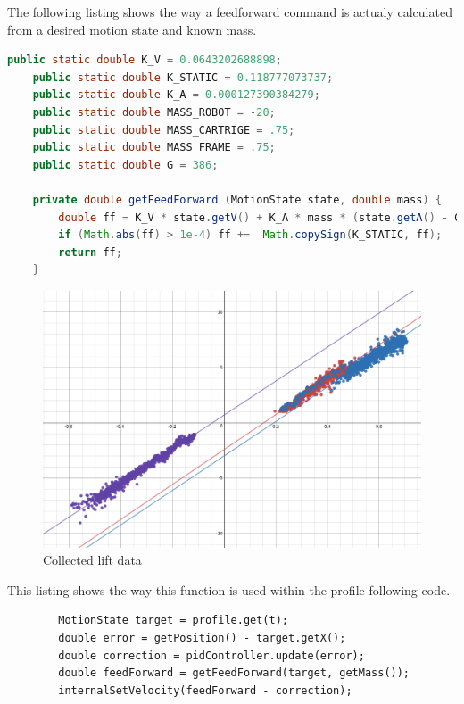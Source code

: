 \documentclass{article}
\begin{document}
The following listing shows the way a feedforward command is actualy calculated from a desired motion state and known mass.
\begin{lstlisting}[language=Java]
    public static double K_V = 0.0643202688898;
    public static double K_STATIC = 0.118777073737;
    public static double K_A = 0.000127390384279;
    public static double MASS_ROBOT = -20;
    public static double MASS_CARTRIGE = .75;
    public static double MASS_FRAME = .75;
    public static double G = 386;

    private double getFeedForward (MotionState state, double mass) {
        double ff = K_V * state.getV() + K_A * mass * (state.getA() - G);
        if (Math.abs(ff) > 1e-4) ff +=  Math.copySign(K_STATIC, ff);
        return ff;
    }
\end{lstlisting}

\begin{figure}
    \centering
    \includegraphics[width=.6\textwidth]{30_03-25/images/graph.png}
    \caption{Collected lift data}
    \label{fig:liftData}
\end{figure}

This listing shows the way this function is used within the profile following code.
\begin{lstlisting}
        MotionState target = profile.get(t);
        double error = getPosition() - target.getX();
        double correction = pidController.update(error);
        double feedForward = getFeedForward(target, getMass());
        internalSetVelocity(feedForward - correction);
\end{lstlisting}
\end{document}
